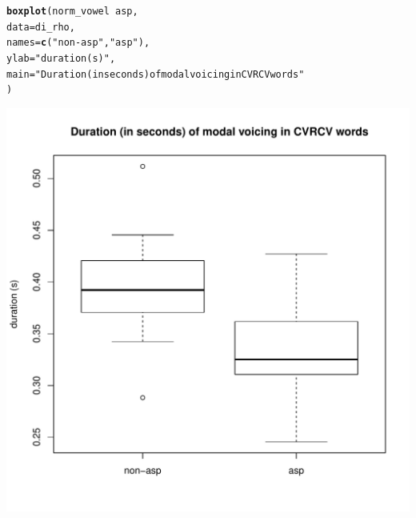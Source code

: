 \documentclass[a4paper,11pt]{article}\usepackage[]{graphicx}\usepackage[]{color}
\makeatletter
\def\maxwidth{ %
  \ifdim\Gin@nat@width>\linewidth
    \linewidth
  \else
    \Gin@nat@width
  \fi
}
\newcommand{\hlstr}[1]{\textcolor[rgb]{0.192,0.494,0.8}{#1}}%
\newcommand{\hlopt}[1]{\textcolor[rgb]{0,0,0}{#1}}%
\newcommand{\hlstd}[1]{\textcolor[rgb]{0.345,0.345,0.345}{#1}}%
\newcommand{\hlkwc}[1]{\textcolor[rgb]{0.333,0.667,0.333}{#1}}%
\newcommand{\hlkwd}[1]{\textcolor[rgb]{0.737,0.353,0.396}{\textbf{#1}}}%
\newenvironment{kframe}{%
 \def\at@end@of@kframe{}%
 \ifinner\ifhmode%
  \def\at@end@of@kframe{\end{minipage}}%
  \begin{minipage}{\columnwidth}%
 \fi\fi%
 \def\FrameCommand##1{\hskip\@totalleftmargin \hskip-\fboxsep
 \colorbox{shadecolor}{##1}\hskip-\fboxsep
     \hskip-\linewidth \hskip-\@totalleftmargin \hskip\columnwidth}%
 \MakeFramed {\advance\hsize-\width
   \@totalleftmargin\z@ \linewidth\hsize
   \@setminipage}}%
 {\par\unskip\endMakeFramed%
 \at@end@of@kframe}
\newenvironment{knitrout}{}{} %
\makeatother
\begin{document}
\begin{knitrout}
\color{fgcolor}\begin{kframe}
\begin{alltt}
\hlkwd{boxplot}\hlstd{(norm_vowel} \hlopt{~} \hlstd{asp,}
        \hlkwc{data} \hlstd{= di_rho,}
        \hlkwc{names} \hlstd{=} \hlkwd{c}\hlstd{(}\hlstr{"non-asp"}\hlstd{,} \hlstr{"asp"}\hlstd{),}
        \hlkwc{ylab} \hlstd{=} \hlstr{"duration (s)"}\hlstd{,}
        \hlkwc{main} \hlstd{=} \hlstr{"Duration (in seconds) of modal voicing in CVRCV words"}
        \hlstd{)}
\end{alltt}
\end{kframe}
\includegraphics[width=\maxwidth]{img/bi-rho-box-1} 

\end{knitrout}
\end{document}
